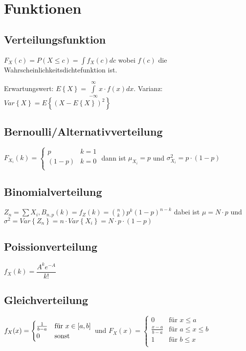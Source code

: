 \documentclass[10pt,a4paper]{article}
\begin{document}
\section{Funktionen}
\subsection{Verteilungsfunktion}
$F_X(c) = P(X \leq c) = \int f_X(c) dc$ wobei $f(c)$ die Wahrscheinlichkeitsdichtefunktion ist.

Erwartungswert: $E\left\{ X \right\} = \int\limits_{-\infty}^\infty x\cdot f(x) dx$. Varianz: $Var\left\{ X \right\} = E\left\{ (X-E\left\{ X \right\})^2 \right\}$

\subsection{Bernoulli/Alternativverteilung}
$F_{X_i}(k)=
\begin{cases}
  p     & k=1\\
  (1-p) & k=0\\
\end{cases}$ dann ist $\mu_{X_i} = p$ und $ \sigma_{X_i}^2 = p\cdot (1-p)$

\subsection{Binomialverteilung}
$Z_n=\sum X_i, B_{n,p}(k) = f_Z(k)=\binom{n}{k} p^k (1-p)^{n-k}$
dabei ist $\mu = N\cdot p$ und $\sigma^2 = Var\left\{Z_n\right\}=n \cdot Var\left\{X_i\right\}= N \cdot p \cdot (1-p)$

\subsection{Poissionverteilung}
$f_X(k) = \dfrac{A^k e^{-A}}{k!}$

\subsection{Gleichverteilung}
$f_X(x) = \begin{cases}
1 \over {b-a} & \mbox{für } x \in \left[a,b\right] \\
0 & \mbox{sonst}
\end{cases}$ und
$F_X(x) = \begin{cases}
0 & \mbox{für } x \leq a \\
\frac{x-a}{b-a} & \mbox{für } a \leq x \leq b \\
1 & \mbox{für } b \leq x \\
\end{cases}$
\end{document}
